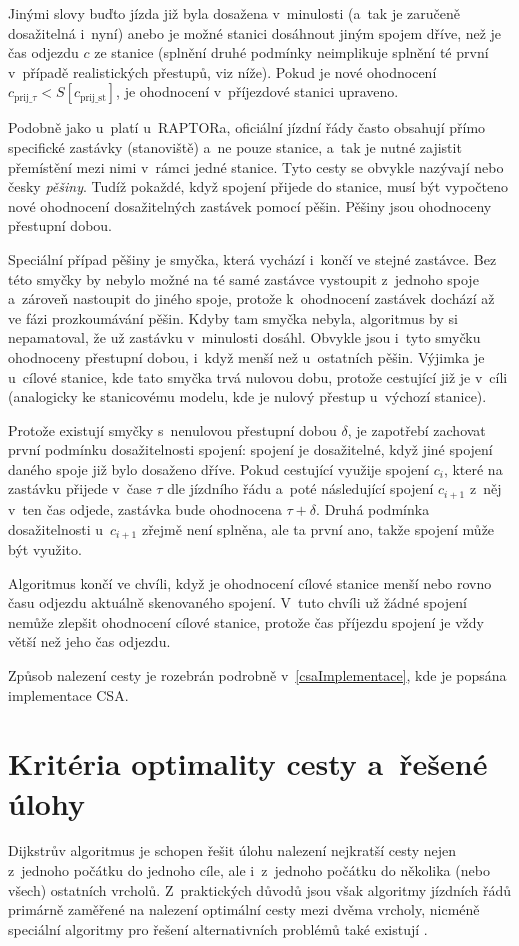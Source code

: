 Jinými slovy buďto jízda již byla dosažena v~minulosti (a~tak je zaručeně dosažitelná i~nyní) anebo je možné stanici dosáhnout jiným spojem dříve, než je čas odjezdu $c$ ze stanice (splnění druhé podmínky neimplikuje splnění té první v~případě realistických přestupů, viz níže). Pokud je nové ohodnocení $c_{\text{prij\_}\tau} < S[c_\text{{prij\_st}}]$, je ohodnocení v~příjezdové stanici upraveno.

Podobně jako u~platí u~RAPTORa, oficiální jízdní řády často obsahují přímo specifické zastávky (stanoviště) a~ne pouze stanice, a~tak je nutné zajistit přemístění mezi nimi v~rámci jedné stanice. Tyto cesty se obvykle nazývají  nebo česky \textit{pěšiny}. Tudíž pokaždé, když spojení přijede do stanice, musí být vypočteno nové ohodnocení dosažitelných zastávek pomocí pěšin. Pěšiny jsou ohodnoceny přestupní dobou.

Speciální případ pěšiny je smyčka, která vychází i~končí ve stejné zastávce. Bez této smyčky by nebylo možné na té samé zastávce vystoupit z~jednoho spoje a~zároveň nastoupit do jiného spoje, protože k~ohodnocení zastávek dochází až ve fázi prozkoumávání pěšin. Kdyby tam smyčka nebyla, algoritmus by si nepamatoval, že už zastávku v~minulosti dosáhl. Obvykle jsou i~tyto smyčku ohodnoceny přestupní dobou, i~když menší než u~ostatních pěšin. Výjimka je u~cílové stanice, kde tato smyčka trvá nulovou dobu, protože cestující již je v~cíli (analogicky ke stanicovému modelu, kde je nulový přestup u~výchozí stanice).

Protože existují smyčky s~nenulovou přestupní dobou \(\delta\), je zapotřebí zachovat první podmínku dosažitelnosti spojení: spojení je dosažitelné, když jiné spojení daného spoje již bylo dosaženo dříve. Pokud cestující využije spojení \(c_i\), které na zastávku přijede v~čase \(\tau\) dle jízdního řádu a~poté následující spojení \(c_{i+1}\) z~něj v~ten čas odjede, zastávka bude ohodnocena \(\tau + \delta\). Druhá podmínka dosažitelnosti u~\(c_{i+1}\) zřejmě není splněna, ale ta první ano, takže spojení může být využito.

Algoritmus končí ve chvíli, když je ohodnocení cílové stanice menší nebo rovno času odjezdu aktuálně skenovaného spojení. V~tuto chvíli už žádné spojení nemůže zlepšit ohodnocení cílové stanice, protože čas příjezdu spojení je vždy větší než jeho čas odjezdu.

Způsob nalezení cesty je rozebrán podrobně v~\autoref{csaImplementace}, kde je popsána implementace CSA.

\section{Kritéria optimality cesty a~řešené úlohy}
\label{sec:kriteriaOptCesty}
Dijkstrův algoritmus je schopen řešit úlohu nalezení nejkratší cesty nejen z~jednoho počátku do jednoho cíle, ale i~z~jednoho počátku do několika (nebo všech) ostatních vrcholů. Z~praktických důvodů jsou však algoritmy jízdních řádů primárně zaměřené na nalezení optimální cesty mezi dvěma vrcholy, nicméně speciální algoritmy pro řešení alternativních problémů také existují \cite{geisberger2010TDOneToAll}.

